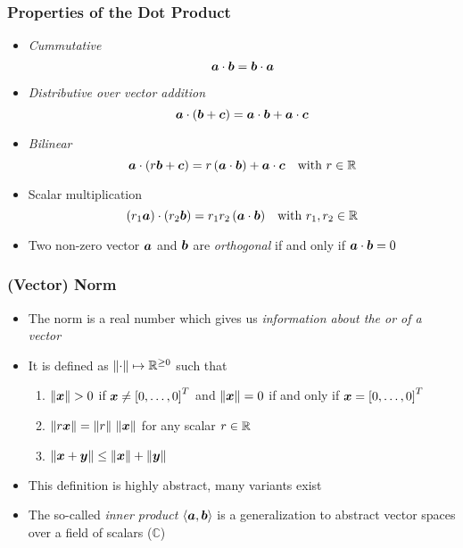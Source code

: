 \documentclass[%
  final,
  11pt, 
  show notes, %
  t, %
  fleqn, %
]{beamer}
\begin{document}
\begin{frame}
\frametitle{Properties of the Dot Product}
\begin{itemize}
\item \emph{Cummutative} 
\begin{equation*}
\bm{a} \cdot \bm{b} = \bm{b} \cdot \bm{a}
\end{equation*}
\item \emph{Distributive over vector addition} 
\begin{equation*}
\bm{a} \cdot (\bm{b} + \bm{c}) = \bm{a} \cdot \bm{b} + \bm{a} \cdot \bm{c}
\end{equation*}
\item \emph{Bilinear}
\begin{equation*}
\bm{a} \cdot (r \bm{b} + \bm{c}) = r \, (\bm{a} \cdot \bm{b}) + \bm{a} \cdot \bm{c} \quad\text{with } r \in\mathbb{R}
\end{equation*}
\item Scalar multiplication
\begin{equation*} 
(r_1 \bm{a}) \cdot (r_2 \bm{b}) = r_1 r_2 \, (\bm{a} \cdot \bm{b}) \quad\text{with } r_1, r_2 \in\mathbb{R}
\end{equation*}
\item Two non-zero vector $\bm{a}$ and $\bm{b}$ are \emph{orthogonal} if and only if $\bm{a} \cdot \bm{b} = 0$
\end{itemize}
\end{frame}

\begin{frame}[fragile]
  \frametitle{(Vector) Norm}
\begin{itemize}
\item The norm is a real number which gives us \emph{information about the  or  of a vector}
\vspace*{0.3cm}
\item It is defined as $\left\Vert \cdot \right\Vert \mapsto \mathbb{R}^{\geq 0}$ such that
\begin{enumerate}
\vspace*{0.2cm}
\item $\left\Vert \bm{x} \right\Vert > 0$ if $\bm{x} \neq \left[ 0, \ldots, 0 \right]^T$ and $\left\Vert \bm{x} \right\Vert = 0$ if and only if $\bm{x} = \left[ 0, \ldots, 0 \right]^T$
\vspace*{0.2cm}
\item $\left\Vert r \bm{x} \right\Vert = \left\Vert r \right\Vert \, \left\Vert \bm{x} \right\Vert$ for any scalar $r \in \mathbb{R}$
\vspace*{0.2cm}
\item $\left\Vert \bm{x} + \bm{y} \right\Vert \leq \left\Vert \bm{x} \right\Vert + \left\Vert \bm{y} \right\Vert$
\end{enumerate}
\item This definition is highly abstract, many variants exist
\vspace*{0.3cm}
\item The so-called \emph{inner product} $\left\langle \bm{a}, \bm{b} \right\rangle$ is a generalization to abstract vector spaces over a field of scalars (\eg $\mathbb{C}$)
\end{itemize}
\end{frame}
\end{document}
